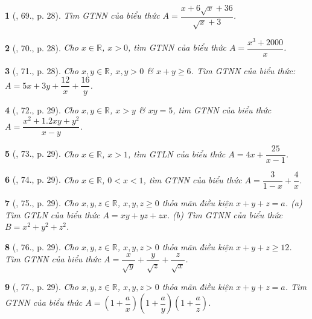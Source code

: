\documentclass{article}
\newtheorem{baitoan}{}
\begin{document}
\begin{baitoan}[\cite{Tuyen_Toan_9_old}, 69., p. 28]
	Tìm {\rm GTNN} của biểu thức $A = \dfrac{x + 6\sqrt{x} + 36}{\sqrt{x} + 3}$.
\end{baitoan}

\begin{baitoan}[\cite{Tuyen_Toan_9_old}, 70., p. 28]
	Cho $x\in\mathbb{R}$, $x > 0$, tìm {\rm GTNN} của biểu thức $A = \dfrac{x^3 + 2000}{x}$.
\end{baitoan}

\begin{baitoan}[\cite{Tuyen_Toan_9_old}, 71., p. 28]
	Cho $x,y\in\mathbb{R}$, $x,y > 0$ \& $x + y\ge6$. Tìm {\rm GTNN} của biểu thức: $A = 5x + 3y + \dfrac{12}{x} + \dfrac{16}{y}$.
\end{baitoan}

\begin{baitoan}[\cite{Tuyen_Toan_9_old}, 72., p. 29]
	Cho $x,y\in\mathbb{R}$, $x > y$ \& $xy = 5$, tìm {\rm GTNN} của biểu thức $A = \dfrac{x^2 + 1.2xy + y^2}{x - y}$.
\end{baitoan}

\begin{baitoan}[\cite{Tuyen_Toan_9_old}, 73., p. 29]
	Cho $x\in\mathbb{R}$, $x > 1$, tìm {\rm GTLN} của biểu thức $A = 4x + \dfrac{25}{x - 1}$.
\end{baitoan}

\begin{baitoan}[\cite{Tuyen_Toan_9_old}, 74., p. 29]
	Cho $x\in\mathbb{R}$, $0 < x < 1$, tìm {\rm GTNN} của biểu thức $A = \dfrac{3}{1 - x} + \dfrac{4}{x}$.
\end{baitoan}

\begin{baitoan}[\cite{Tuyen_Toan_9_old}, 75., p. 29]
	Cho $x,y,z\in\mathbb{R}$, $x,y,z\ge0$ thỏa mãn điều kiện $x + y + z = a$. (a) Tìm {\rm GTLN} của biểu thức $A = xy + yz + zx$. (b) Tìm {\rm GTNN} của biểu thức $B = x^2 + y^2 + z^2$.
\end{baitoan}

\begin{baitoan}[\cite{Tuyen_Toan_9_old}, 76., p. 29]
	Cho $x,y,z\in\mathbb{R}$, $x,y,z > 0$ thỏa mãn điều kiện $x + y + z\ge12$. Tìm {\rm GTNN} của biểu thức $A = \dfrac{x}{\sqrt{y}} + \dfrac{y}{\sqrt{z}} + \dfrac{z}{\sqrt{x}}$.
\end{baitoan}

\begin{baitoan}[\cite{Tuyen_Toan_9_old}, 77., p. 29]
	Cho $x,y,z\in\mathbb{R}$, $x,y,z > 0$ thỏa mãn điều kiện $x + y + z = a$. Tìm {\rm GTNN} của biểu thức $A = \left(1 + \dfrac{a}{x}\right)\left(1 + \dfrac{a}{y}\right)\left(1 + \dfrac{a}{z}\right)$.
\end{baitoan}
\end{document}

